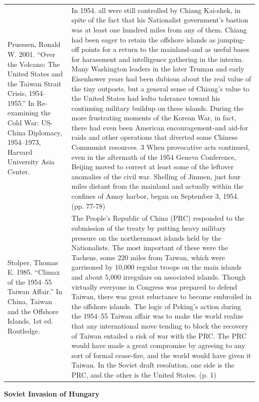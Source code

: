 {\begin{longtable}{p{}p{}}
\\
Pruessen, Ronald W. 2001. “Over the Volcano: The United States and the Taiwan Strait Crisis, 1954–1955.” In Re-examining the Cold War: US-China Diplomacy, 1954–1973, Harvard University Asia Center. & In 1954. all were still controlled by Chiang Kai-shek, in spite of the fact that his Nationalist government's bastion was at least one hundred miles from any of them. Chiang had been eager to retain the offshore islands as jumping-off points for a return to the mainland-and as useful bases for harassment and intelligence gathering in the interim. Many Washington leaders in the later Truman and early Eisenhower years had been dubious about the real value of the tiny outposts, but a general sense of Chiang's value to the United States had ledto tolerance toward his continuing military buildup on these islands. During the more frustrating moments of the Korean War, in fact, there had even been American encouragement-and aid-for raids and other operations that diverted some Chinese Communist resources. 3 When provocative acts continued, even in the aftermath of the 1954 Geneva Conference, Beijing moved to correct at least some of the leftover anomalies of the civil war. Shelling of Jinmen, just four miles distant from the mainland and actually within the confines of Amoy harbor, began on September 3, 1954. (pp. 77-78)
\\
Stolper, Thomas E. 1985. “Climax of the 1954–55 Taiwan Affair.” In China, Taiwan and the Offshore Islands, 1st ed. Routledge. & The People's Republic of China (PRC) responded to the submission of the treaty by putting heavy military pressure on the northernmost islands held by the Nationalists. The most important of these were the Tachens, some 220 miles from Taiwan, which were garrisoned by 10,000 regular troops on the main islands and about 5,000 irregulars on associated islands. Though virtually everyone in Congress was prepared to defend Taiwan, there was great reluctance to become embroiled in the offshore islands. The logic of Peking's action during the 1954–55 Taiwan affair was to make the world realize that any international move tending to block the recovery of Taiwan entailed a risk of war with the PRC. The PRC would have made a great compromise by agreeing to any sort of formal cease-fire, and the world would have given it Taiwan. In the Soviet draft resolution, one side is the PRC, and the other is the United States.  (p. 1)
\\
\end{longtable}}
\clearpage
         \textbf{Soviet Invasion of Hungary} 

